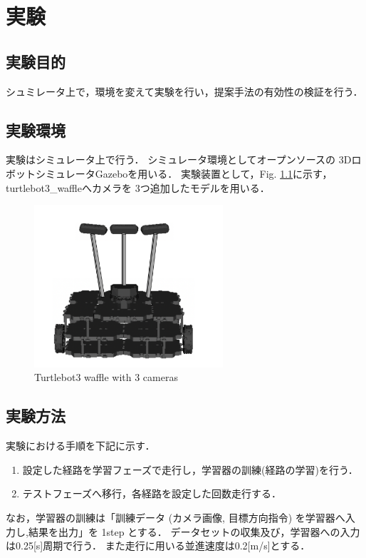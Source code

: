 \chapter{実験}
\section{実験目的}
シュミレータ上で，環境を変えて実験を行い，提案手法の有効性の検証を行う．
\section{実験環境}
実験はシミュレータ上で行う．
シミュレータ環境としてオープンソースの
3DロボットシミュレータGazebo\cite{gazebo:online}を用いる．
実験装置として，Fig. \ref{fig::turtlebot3}に示す，turtlebot3\_waffle\cite{turtlebot3:online}へカメラを
3つ追加したモデルを用いる．

\begin{figure}[H]
    \centering
    \includegraphics[width = 7cm]{./figs/3_camera.png}
    \caption{Turtlebot3 waffle with 3 cameras}
    \label{fig::turtlebot3}
\end{figure}

\section{実験方法}

実験における手順を下記に示す．
\begin{enumerate}
  \item 設定した経路を学習フェーズで走行し，学習器の訓練(経路の学習)を行う．
  \item テストフェーズへ移行，各経路を設定した回数走行する．
\end{enumerate}
なお，学習器の訓練は「訓練データ (カメラ画像, 目標方向指令) を学習器へ入力し,結果を出力」を 1step とする．
データセットの収集及び，学習器への入力は0.25[s]周期で行う．
また走行に用いる並進速度は0.2[m/s]とする．

